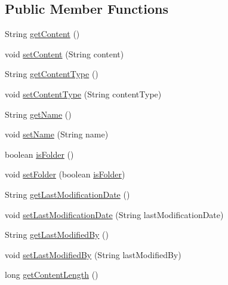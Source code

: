 \subsection*{Public Member Functions}
\begin{DoxyCompactItemize}
\item 
String \hyperlink{classcom_1_1zia_1_1freshdocs_1_1model_1_1_node_ref_aa0553796707fdde48b8ac780b3b9042c}{get\-Content} ()
\item 
void \hyperlink{classcom_1_1zia_1_1freshdocs_1_1model_1_1_node_ref_a057a8345c935095907b9a6c0076fcf6c}{set\-Content} (String content)
\item 
String \hyperlink{classcom_1_1zia_1_1freshdocs_1_1model_1_1_node_ref_a3534ba1f4dea5dcb65799a180b8b2562}{get\-Content\-Type} ()
\item 
void \hyperlink{classcom_1_1zia_1_1freshdocs_1_1model_1_1_node_ref_aaeb2e918917229d66388568498b6b55e}{set\-Content\-Type} (String content\-Type)
\item 
String \hyperlink{classcom_1_1zia_1_1freshdocs_1_1model_1_1_node_ref_a77208df0780fe5ca25979eeea93b63e9}{get\-Name} ()
\item 
void \hyperlink{classcom_1_1zia_1_1freshdocs_1_1model_1_1_node_ref_a13fc78ac01eda2a4d2892d02128abca6}{set\-Name} (String name)
\item 
boolean \hyperlink{classcom_1_1zia_1_1freshdocs_1_1model_1_1_node_ref_a1e9b0471598a01f26c9d792c8b752748}{is\-Folder} ()
\item 
void \hyperlink{classcom_1_1zia_1_1freshdocs_1_1model_1_1_node_ref_aa510b456597a0b089602cacb4b0726dd}{set\-Folder} (boolean \hyperlink{classcom_1_1zia_1_1freshdocs_1_1model_1_1_node_ref_a1e9b0471598a01f26c9d792c8b752748}{is\-Folder})
\item 
String \hyperlink{classcom_1_1zia_1_1freshdocs_1_1model_1_1_node_ref_a98f7678832d35a934c5726bd68aa8cea}{get\-Last\-Modification\-Date} ()
\item 
void \hyperlink{classcom_1_1zia_1_1freshdocs_1_1model_1_1_node_ref_a29c4c930d2a086a47bd48f2de6f1f3f8}{set\-Last\-Modification\-Date} (String last\-Modification\-Date)
\item 
String \hyperlink{classcom_1_1zia_1_1freshdocs_1_1model_1_1_node_ref_a464ece894e3efc3adbfb091244271939}{get\-Last\-Modified\-By} ()
\item 
void \hyperlink{classcom_1_1zia_1_1freshdocs_1_1model_1_1_node_ref_aceddf9e0499f00c16041eada6ed68abd}{set\-Last\-Modified\-By} (String last\-Modified\-By)
\item 
long \hyperlink{classcom_1_1zia_1_1freshdocs_1_1model_1_1_node_ref_a5eb47d6b0f9b13a81745a89397c7ae7f}{get\-Content\-Length} ()

\end{DoxyCompactItemize}
